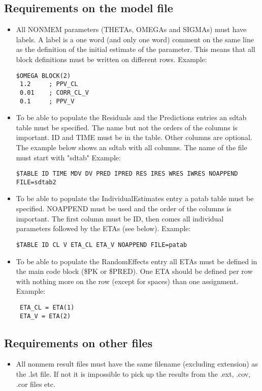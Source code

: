 \subsection{Requirements on the model file}
\begin{itemize}
    \item All NONMEM parameters (THETAs, OMEGAs and SIGMAs) must have labels. A label is a one word (and only one word) comment on the same line as the definition of the initial estimate of the parameter. This means that all block definitions must be written on different rows. Example:
        \begin{verbatim}
$OMEGA BLOCK(2)
 1.2     ; PPV_CL
 0.01    ; CORR_CL_V
 0.1     ; PPV_V
        \end{verbatim}
    \item To be able to populate the Residuals and the Predictions entries an sdtab table must be specified. The name but not the orders of the columns is important. ID and TIME must be in the table. Other columns are optional. The example below shows an sdtab with all columns. The name of the file must start with "sdtab" Example:
        \begin{verbatim}
$TABLE ID TIME MDV DV PRED IPRED RES IRES WRES IWRES NOAPPEND FILE=sdtab2
        \end{verbatim}
    \item To be able to populate the IndividualEstimates entry a patab table must be specified. NOAPPEND must be used and the order of the columns is important. The first column must be ID, then comes all individual parameters followed by the ETAs (see below). Example:
        \begin{verbatim}
$TABLE ID CL V ETA_CL ETA_V NOAPPEND FILE=patab
        \end{verbatim}
    \item To be able to populate the RandomEffects entry all ETAs must be defined in the main code block (\$PK or \$PRED). One ETA should be defined per row with nothing more on the row (except for spaces) than one assignment. Example:
        \begin{verbatim}
 ETA_CL = ETA(1)
 ETA_V = ETA(2)
        \end{verbatim}
\end{itemize}


\subsection{Requirements on other files}
\begin{itemize}
    \item All nonmem result files must have the same filename (excluding extension) as the .lst file. If not it is impossible to pick up the results from the .ext, .cov, .cor files etc.
\end{itemize}


